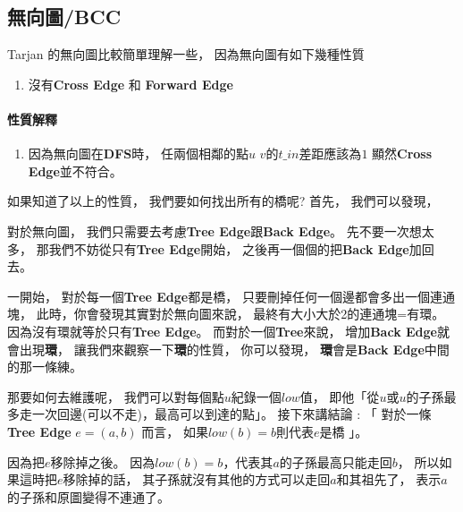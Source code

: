 \documentclass[12pt,oneside]{article}
\begin{document}
\subsection{無向圖/BCC}

Tarjan 的無向圖比較簡單理解一些，
因為無向圖有如下幾種性質
\vspace*{1em}
\begin{adjustwidth}{2em}{0em}
\begin{enumerate}
    \item 沒有\textbf{Cross Edge} 和 \textbf{Forward Edge}
\end{enumerate}
\end{adjustwidth}
\vspace*{1em}

\paragraph{性質解釋}
\begin{adjustwidth}{2em}{0em}
\begin{enumerate}
    \item
        因為無向圖在\textbf{DFS}時，
        任兩個相鄰的點$u$ $v$的$t\_in$差距應該為$1$
        顯然\textbf{Cross Edge}並不符合。
\end{enumerate}
\end{adjustwidth}

如果知道了以上的性質，
我們要如何找出所有的橋呢?
首先，
我們可以發現，

對於無向圖，
我們只需要去考慮\textbf{Tree Edge}跟\textbf{Back Edge}。
先不要一次想太多，
那我們不妨從只有\textbf{Tree Edge}開始，
之後再一個個的把\textbf{Back Edge}加回去。

一開始，
對於每一個\textbf{Tree Edge}都是橋，
只要刪掉任何一個邊都會多出一個連通塊，
此時，你會發現其實對於無向圖來說，
{\color{red} 最終有大小大於2的連通塊=有環}。%
因為沒有環就等於只有\textbf{Tree Edge}。
而對於一個\textbf{Tree}來說，
增加\textbf{Back Edge}就會出現\textbf{環}，
讓我們來觀察一下\textbf{環}的性質，
你可以發現，
\textbf{環}會是\textbf{Back Edge}中間的那一條練。

那要如何去維護呢，
我們可以對每個點$u$紀錄一個$low$值，
即他「從$u$或$u$的子孫最多走一次回邊(可以不走)，最高可以到達的點」。
接下來講結論 : 「
對於一條\textbf{Tree Edge} $e = (a, b)$ 而言，
如果$low(b) = b$則代表$e$是橋
」。

因為把$e$移除掉之後。
因為$low(b) = b$，代表其$a$的子孫最高只能走回$b$，
所以如果這時把$e$移除掉的話，
其子孫就沒有其他的方式可以走回$a$和其祖先了，
表示$a$的子孫和原圖變得不連通了。
\end{document}
